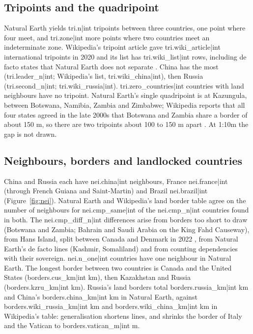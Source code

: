 \documentclass[11pt,a4paper]{article}
\begin{document}
\subsection{Tripoints and the quadripoint}
Natural Earth yields {{tri.n|int}} tripoints between three countries, one point where four meet, and {{tri.zone|int}} more points where two countries meet an indeterminate zone. Wikipedia's tripoint article gave {{tri.wiki_article|int}} international tripoints in 2020 and its list has {{tri.wiki_list|int}} rows, including de facto states that Natural Earth does not separate \citep{wtri,wtrilist}. China has the most ({{tri.leader_n|int}}; Wikipedia's list, {{tri.wiki_china|int}}), then Russia ({{tri.second_n|int}}; {{tri.wiki_russia|int}}). {{tri.zero_countries|int}} countries with land neighbours have no tripoint. Natural Earth's single quadripoint is at Kazungula, between Botswana, Namibia, Zambia and Zimbabwe; Wikipedia reports that all four states agreed in the late 2000s that Botswana and Zambia share a border of about 150 m, so there are two tripoints about 100 to 150 m apart \citep{wquad}. At 1:10m the gap is not drawn.

\subsection{Neighbours, borders and landlocked countries}
China and Russia each have {{nei.china|int}} neighbours, France {{nei.france|int}} (through French Guiana and Saint-Martin) and Brazil {{nei.brazil|int}} (Figure~\ref{fig:nei}). Natural Earth and Wikipedia's land border table \citep{wland} agree on the number of neighbours for {{nei.cmp_same|int}} of the {{nei.cmp_n|int}} countries found in both. The {{nei.cmp_diff_n|int}} differences arise from borders too short to draw (Botswana and Zambia; Bahrain and Saudi Arabia on the King Fahd Causeway), from Hans Island, split between Canada and Denmark in 2022 \citep{whans}, from Natural Earth's de facto lines (Kashmir, Somaliland) and from counting dependencies with their sovereign. {{nei.n_one|int}} countries have one neighbour in Natural Earth. The longest border between two countries is Canada and the United States ({{borders.cus_km|int}} km), then Kazakhstan and Russia ({{borders.kzru_km|int}} km). Russia's land borders total {{borders.russia_km|int}} km and China's {{borders.china_km|int}} km in Natural Earth, against {{borders.wiki_russia_km|int}} km and {{borders.wiki_china_km|int}} km in Wikipedia's table: generalisation shortens lines, and shrinks the border of Italy and the Vatican to {{borders.vatican_m|int}} m.
\end{document}
